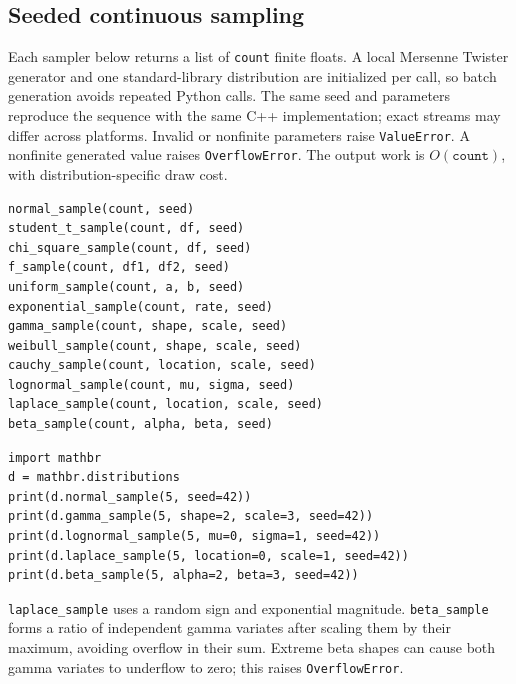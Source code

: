 \documentclass[11pt,a4paper]{article}
\begin{document}
\subsection{Seeded continuous sampling}
Each sampler below returns a list of \verb|count| finite floats. A local Mersenne Twister generator and one standard-library distribution are initialized per call, so batch generation avoids repeated Python calls. The same seed and parameters reproduce the sequence with the same C++ implementation; exact streams may differ across platforms. Invalid or nonfinite parameters raise \verb|ValueError|. A nonfinite generated value raises \verb|OverflowError|. The output work is $O(\texttt{count})$, with distribution-specific draw cost.
\begin{verbatim}
normal_sample(count, seed)
student_t_sample(count, df, seed)
chi_square_sample(count, df, seed)
f_sample(count, df1, df2, seed)
uniform_sample(count, a, b, seed)
exponential_sample(count, rate, seed)
gamma_sample(count, shape, scale, seed)
weibull_sample(count, shape, scale, seed)
cauchy_sample(count, location, scale, seed)
lognormal_sample(count, mu, sigma, seed)
laplace_sample(count, location, scale, seed)
beta_sample(count, alpha, beta, seed)
\end{verbatim}
\begin{verbatim}
import mathbr
d = mathbr.distributions
print(d.normal_sample(5, seed=42))
print(d.gamma_sample(5, shape=2, scale=3, seed=42))
print(d.lognormal_sample(5, mu=0, sigma=1, seed=42))
print(d.laplace_sample(5, location=0, scale=1, seed=42))
print(d.beta_sample(5, alpha=2, beta=3, seed=42))
\end{verbatim}
\verb|laplace_sample| uses a random sign and exponential magnitude. \verb|beta_sample| forms a ratio of independent gamma variates after scaling them by their maximum, avoiding overflow in their sum. Extreme beta shapes can cause both gamma variates to underflow to zero; this raises \verb|OverflowError|.
\end{document}
